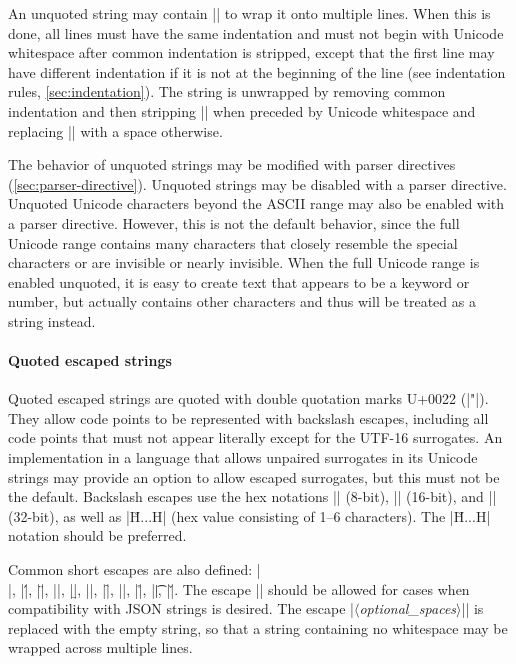 \documentclass[11pt]{article}
\newcommand{\vmeta}[1]{{\color{DarkRed}\ensuremath{\langle}\textit{#1}\ensuremath{\rangle}}}
\begin{document}
An unquoted string may contain |\n| to wrap it onto multiple lines.  When this is done, all lines must have the same indentation and must not begin with Unicode whitespace after common indentation is stripped, except that the first line may have different indentation if it is not at the beginning of the line (see indentation rules, \cref{sec:indentation}).  The string is unwrapped by removing common indentation and then stripping |\n| when preceded by Unicode whitespace and replacing |\n| with a space otherwise.

The behavior of unquoted strings may be modified with parser directives (\cref{sec:parser-directive}).  Unquoted strings may be disabled with a parser directive.  Unquoted Unicode characters beyond the ASCII range may also be enabled with a parser directive.  However, this is not the default behavior, since the full Unicode range contains many characters that closely resemble the special characters or are invisible or nearly invisible.  When the full Unicode range is enabled unquoted, it is easy to create text that appears to be a keyword or number, but actually contains other characters and thus will be treated as a string instead.


\paragraph{Quoted escaped strings}

Quoted escaped strings are quoted with double quotation marks U+0022 (|"|).  They allow code points to be represented with backslash escapes, including all code points that must not appear literally except for the UTF-16 surrogates.  An implementation in a language that allows unpaired surrogates in its Unicode strings may provide an option to allow escaped surrogates, but this must not be the default.  Backslash escapes use the hex notations |\xHH| (8-bit), |\uHHHH| (16-bit), and |\UHHHHHHHH| (32-bit), as well as |\u{H...H}| (hex value consisting of 1--6 characters).  The |\u{H...H}| notation should be preferred.

Common short escapes are also defined:  |\\|, |\'|, |\"|, |\a|, |\b|, |\e|, |\f|, |\n|, |\r|, |\t|, |\v|.  The escape |\/| should be allowed for cases when compatibility with JSON strings is desired.  The escape |\|\vmeta{optional\_spaces}|\n| is replaced with the empty string, so that a string containing no whitespace may be wrapped across multiple lines.
\end{document}
